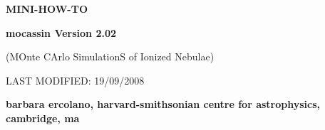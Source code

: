 \documentclass[11pt]{article}
\begin{document}
\centerline
{\Large \bf MINI-HOW-TO }

\vspace{4cm}

\centerline
{\Large \bf {\sc \Huge mocassin} Version 2.02 }

\vspace{2cm}

\centerline
{\Large (MOnte CArlo SimulationS of Ionized Nebulae) }


\vspace{3cm}

\centerline
{LAST MODIFIED: 19/09/2008}



\vspace{10cm}



\centerline
{\bf barbara ercolano, harvard-smithsonian centre for astrophysics,
  cambridge, ma} 

\vspace{10cm}


\vspace{0.7cm}

\pagebreak
\end{document}
